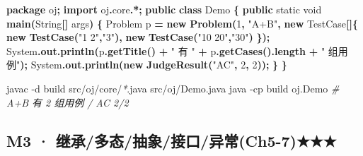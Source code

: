 \documentclass[
  11pt,
]{ctexart}
\newenvironment{Shaded}{\begin{snugshade}}{\end{snugshade}}
\newcommand{\AttributeTok}[1]{\textcolor[rgb]{0.13,0.29,0.53}{#1}}
\newcommand{\BuiltInTok}[1]{#1}
\newcommand{\CommentTok}[1]{\textcolor[rgb]{0.56,0.35,0.01}{\textit{#1}}}
\newcommand{\DataTypeTok}[1]{\textcolor[rgb]{0.13,0.29,0.53}{#1}}
\newcommand{\DecValTok}[1]{\textcolor[rgb]{0.00,0.00,0.81}{#1}}
\newcommand{\ExtensionTok}[1]{#1}
\newcommand{\FunctionTok}[1]{\textcolor[rgb]{0.13,0.29,0.53}{\textbf{#1}}}
\newcommand{\ImportTok}[1]{#1}
\newcommand{\KeywordTok}[1]{\textcolor[rgb]{0.13,0.29,0.53}{\textbf{#1}}}
\newcommand{\NormalTok}[1]{#1}
\newcommand{\OperatorTok}[1]{\textcolor[rgb]{0.81,0.36,0.00}{\textbf{#1}}}
\newcommand{\PreprocessorTok}[1]{\textcolor[rgb]{0.56,0.35,0.01}{\textit{#1}}}
\newcommand{\StringTok}[1]{\textcolor[rgb]{0.31,0.60,0.02}{#1}}
\begin{document}
\begin{Shaded}
\begin{Highlighting}[]
\KeywordTok{package}\ImportTok{ oj}\OperatorTok{;}
\KeywordTok{import} \ImportTok{oj}\OperatorTok{.}\ImportTok{core}\OperatorTok{.*;}
\KeywordTok{public} \KeywordTok{class}\NormalTok{ Demo }\OperatorTok{\{}
    \KeywordTok{public} \DataTypeTok{static} \DataTypeTok{void} \FunctionTok{main}\OperatorTok{(}\BuiltInTok{String}\OperatorTok{[]}\NormalTok{ args}\OperatorTok{)} \OperatorTok{\{}
\NormalTok{        Problem p }\OperatorTok{=} \KeywordTok{new} \FunctionTok{Problem}\OperatorTok{(}\DecValTok{1}\OperatorTok{,} \StringTok{"A+B"}\OperatorTok{,} \KeywordTok{new}\NormalTok{ TestCase}\OperatorTok{[]\{} \KeywordTok{new} \FunctionTok{TestCase}\OperatorTok{(}\StringTok{"1 2"}\OperatorTok{,}\StringTok{"3"}\OperatorTok{),} \KeywordTok{new} \FunctionTok{TestCase}\OperatorTok{(}\StringTok{"10 20"}\OperatorTok{,}\StringTok{"30"}\OperatorTok{)} \OperatorTok{\});}
        \BuiltInTok{System}\OperatorTok{.}\FunctionTok{out}\OperatorTok{.}\FunctionTok{println}\OperatorTok{(}\NormalTok{p}\OperatorTok{.}\FunctionTok{getTitle}\OperatorTok{()} \OperatorTok{+} \StringTok{" 有 "} \OperatorTok{+}\NormalTok{ p}\OperatorTok{.}\FunctionTok{getCases}\OperatorTok{().}\FunctionTok{length} \OperatorTok{+} \StringTok{" 组用例"}\OperatorTok{);}
        \BuiltInTok{System}\OperatorTok{.}\FunctionTok{out}\OperatorTok{.}\FunctionTok{println}\OperatorTok{(}\KeywordTok{new} \FunctionTok{JudgeResult}\OperatorTok{(}\StringTok{"AC"}\OperatorTok{,} \DecValTok{2}\OperatorTok{,} \DecValTok{2}\OperatorTok{));}
    \OperatorTok{\}}
\OperatorTok{\}}
\end{Highlighting}
\end{Shaded}

\begin{Shaded}
\begin{Highlighting}[]
\ExtensionTok{javac} \AttributeTok{{-}d}\NormalTok{ build src/oj/core/}\PreprocessorTok{*}\NormalTok{.java src/oj/Demo.java}
\ExtensionTok{java} \AttributeTok{{-}cp}\NormalTok{ build oj.Demo            }\CommentTok{\# A+B 有 2 组用例 / AC 2/2}
\end{Highlighting}
\end{Shaded}

\hypertarget{m3-ux7ee7ux627fux591aux6001ux62bdux8c61ux63a5ux53e3ux5f02ux5e38ch5-7}{%
\subsection{M3 ·
继承/多态/抽象/接口/异常(Ch5-7)★★★}\label{m3-ux7ee7ux627fux591aux6001ux62bdux8c61ux63a5ux53e3ux5f02ux5e38ch5-7}}
\end{document}

